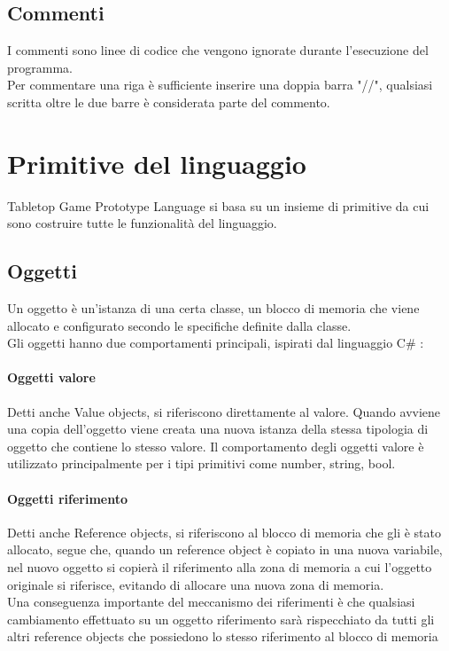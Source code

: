 \subsection{Commenti}
I commenti sono linee di codice che vengono ignorate durante l'esecuzione del programma. \\
Per commentare una riga è sufficiente inserire una doppia barra "//", qualsiasi scritta oltre 
le due barre è considerata parte del commento.

\section{Primitive del linguaggio}
Tabletop Game Prototype Language si basa su un insieme di primitive da cui sono costruire tutte 
le funzionalità del linguaggio.
 
\subsection{Oggetti}
Un oggetto è un'istanza di una certa classe, un blocco di memoria che viene allocato e configurato secondo
le specifiche definite dalla classe. \\
Gli oggetti hanno due comportamenti principali, ispirati dal linguaggio C\# \cite{CSharpLang}:
\paragraph{Oggetti valore} Detti anche Value objects, 
si riferiscono direttamente al valore. Quando avviene una copia dell'oggetto
viene creata una nuova istanza della stessa tipologia di oggetto che contiene lo stesso valore.
Il comportamento degli oggetti valore è utilizzato principalmente per i tipi primitivi come number, string, bool. 
\paragraph{Oggetti riferimento} Detti anche Reference objects, 
si riferiscono al blocco di memoria che gli è stato allocato, segue che, 
quando un reference object è copiato in una nuova variabile, nel nuovo oggetto si copierà 
il riferimento alla zona di memoria a cui l'oggetto originale si riferisce, evitando di allocare una
nuova zona di memoria. 
\\
Una conseguenza importante del meccanismo dei riferimenti è che qualsiasi cambiamento effettuato su un
oggetto riferimento sarà rispecchiato da tutti gli altri reference objects che possiedono lo stesso riferimento
al blocco di memoria

